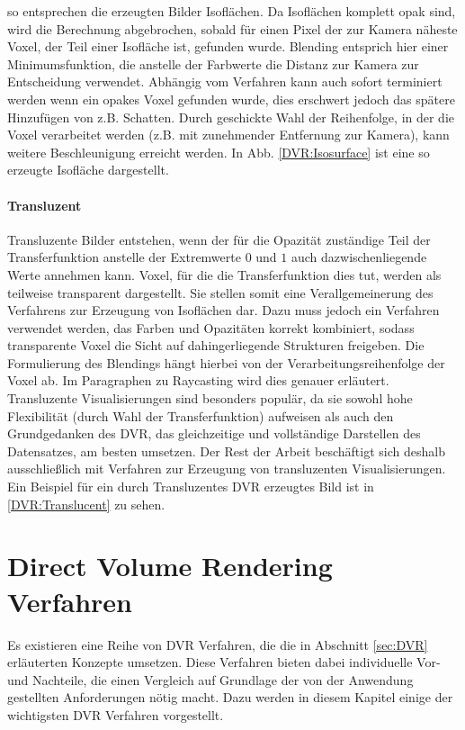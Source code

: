 \documentclass[a4paper,fontsize=12pt,toc=bib,halfparskip]{scrartcl}
\begin{document}
so entsprechen die erzeugten Bilder Isofl\"achen. Da Isofl\"achen komplett opak sind, wird die Berechnung abgebrochen, sobald f\"ur einen Pixel der zur Kamera n\"aheste Voxel, der Teil einer Isofl\"ache ist, gefunden wurde. Blending entsprich hier einer Minimumsfunktion, die anstelle der Farbwerte die Distanz zur Kamera zur Entscheidung verwendet. Abh\"angig vom Verfahren kann auch sofort terminiert werden wenn ein opakes Voxel gefunden wurde, dies erschwert jedoch das sp\"atere Hinzuf\"ugen von z.B. Schatten. Durch geschickte Wahl der Reihenfolge, in der die Voxel verarbeitet werden (z.B. mit zunehmender Entfernung zur Kamera), kann weitere Beschleunigung erreicht werden. In Abb. \ref{DVR:Isosurface} ist eine so erzeugte Isofl\"ache dargestellt.

\paragraph{Transluzent}
Transluzente Bilder entstehen, wenn der f\"ur die Opazit\"at zust\"andige Teil der Transferfunktion anstelle der Extremwerte $0$ und $1$ auch dazwischenliegende Werte annehmen kann. Voxel, f\"ur die die Transferfunktion dies tut, werden als teilweise transparent dargestellt. Sie stellen somit eine Verallgemeinerung des Verfahrens zur Erzeugung von Isofl\"achen dar. Dazu muss jedoch ein Verfahren verwendet werden, das Farben und Opazit\"aten korrekt kombiniert, sodass transparente Voxel die Sicht auf dahingerliegende Strukturen freigeben. Die Formulierung des Blendings h\"angt hierbei von der Verarbeitungsreihenfolge der Voxel ab. Im Paragraphen zu Raycasting wird dies genauer erl\"autert. Transluzente Visualisierungen sind besonders popul\"ar, da sie sowohl hohe Flexibilit\"at (durch Wahl der Transferfunktion) aufweisen als auch den Grundgedanken des DVR, das gleichzeitige und vollst\"andige Darstellen des Datensatzes, am besten umsetzen. Der Rest der Arbeit besch\"aftigt sich deshalb ausschlie{\ss}lich mit Verfahren zur Erzeugung von transluzenten Visualisierungen. Ein Beispiel f\"ur ein durch Transluzentes DVR erzeugtes Bild ist in \ref{DVR:Translucent} zu sehen. 

\section{Direct Volume Rendering Verfahren}
Es existieren eine Reihe von DVR Verfahren, die die in Abschnitt \ref{sec:DVR} erl\"auterten Konzepte umsetzen. Diese Verfahren bieten dabei individuelle Vor- und Nachteile, die einen Vergleich auf Grundlage der von der Anwendung gestellten Anforderungen n\"otig macht. Dazu werden in diesem Kapitel einige der wichtigsten DVR Verfahren vorgestellt.
\end{document}
